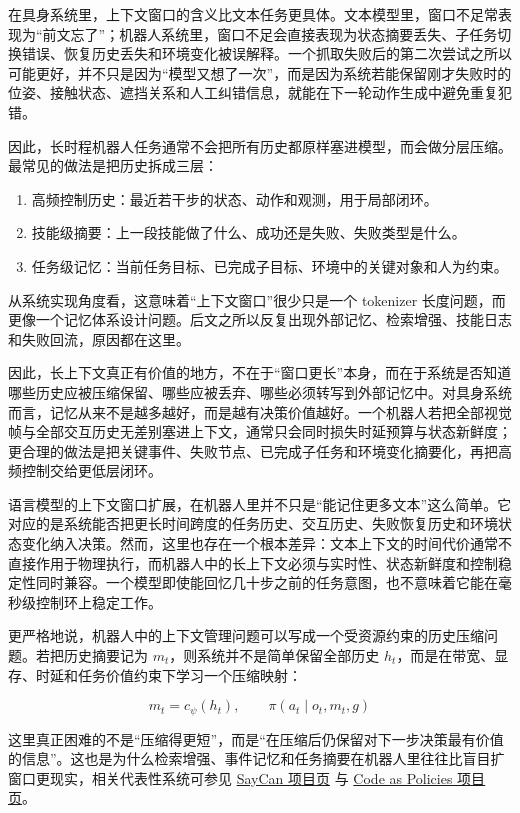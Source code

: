 在具身系统里，上下文窗口的含义比文本任务更具体。文本模型里，窗口不足常表现为“前文忘了”；机器人系统里，窗口不足会直接表现为状态摘要丢失、子任务切换错误、恢复历史丢失和环境变化被误解释。一个抓取失败后的第二次尝试之所以可能更好，并不只是因为“模型又想了一次”，而是因为系统若能保留刚才失败时的位姿、接触状态、遮挡关系和人工纠错信息，就能在下一轮动作生成中避免重复犯错。

因此，长时程机器人任务通常不会把所有历史都原样塞进模型，而会做分层压缩。最常见的做法是把历史拆成三层：

\begin{enumerate}
\item 高频控制历史：最近若干步的状态、动作和观测，用于局部闭环。
\item 技能级摘要：上一段技能做了什么、成功还是失败、失败类型是什么。
\item 任务级记忆：当前任务目标、已完成子目标、环境中的关键对象和人为约束。
\end{enumerate}

从系统实现角度看，这意味着“上下文窗口”很少只是一个 tokenizer 长度问题，而更像一个记忆体系设计问题。后文之所以反复出现外部记忆、检索增强、技能日志和失败回流，原因都在这里。

因此，长上下文真正有价值的地方，不在于“窗口更长”本身，而在于系统是否知道哪些历史应被压缩保留、哪些应被丢弃、哪些必须转写到外部记忆中。对具身系统而言，记忆从来不是越多越好，而是越有决策价值越好。一个机器人若把全部视觉帧与全部交互历史无差别塞进上下文，通常只会同时损失时延预算与状态新鲜度；更合理的做法是把关键事件、失败节点、已完成子任务和环境变化摘要化，再把高频控制交给更低层闭环。

语言模型的上下文窗口扩展，在机器人里并不只是“能记住更多文本”这么简单。它对应的是系统能否把更长时间跨度的任务历史、交互历史、失败恢复历史和环境状态变化纳入决策。然而，这里也存在一个根本差异：文本上下文的时间代价通常不直接作用于物理执行，而机器人中的长上下文必须与实时性、状态新鲜度和控制稳定性同时兼容。一个模型即使能回忆几十步之前的任务意图，也不意味着它能在毫秒级控制环上稳定工作。

更严格地说，机器人中的上下文管理问题可以写成一个受资源约束的历史压缩问题。若把历史摘要记为 \(m_t\)，则系统并不是简单保留全部历史 \(h_t\)，而是在带宽、显存、时延和任务价值约束下学习一个压缩映射：

\begin{equation*}
m_t = c_\psi(h_t), \qquad \pi(a_t \mid o_t, m_t, g)
\end{equation*}

这里真正困难的不是“压缩得更短”，而是“在压缩后仍保留对下一步决策最有价值的信息”。这也是为什么检索增强、事件记忆和任务摘要在机器人里往往比盲目扩窗口更现实，相关代表性系统可参见 \href{https://say-can.github.io/}{SayCan 项目页} 与 \href{https://code-as-policies.github.io/}{Code as Policies 项目页}。

